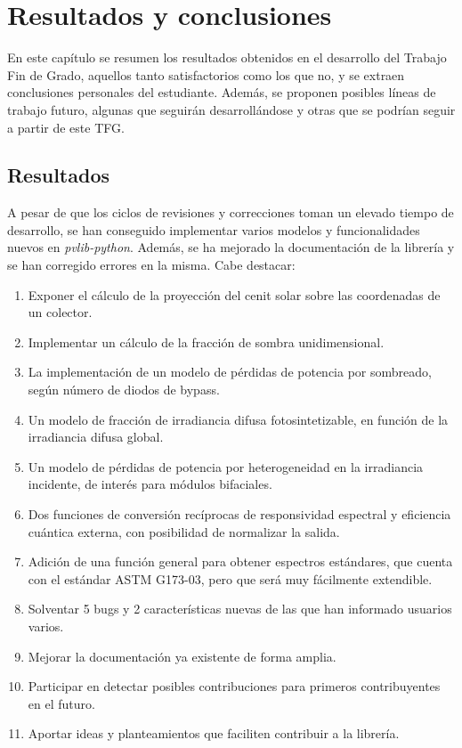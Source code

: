 \chapter{Resultados y conclusiones} \label{chp:resultados}

En este capítulo se resumen los resultados obtenidos en el desarrollo del Trabajo Fin de Grado, aquellos tanto satisfactorios como los que no, y se extraen conclusiones personales del estudiante. Además, se proponen posibles líneas de trabajo futuro, algunas que seguirán desarrollándose y otras que se podrían seguir a partir de este TFG.


\section{Resultados} \label{sct:resultados_resultados}

A pesar de que los ciclos de revisiones y correcciones toman un elevado tiempo de desarrollo, se han conseguido implementar varios modelos y funcionalidades nuevos en \textit{pvlib-python}. Además, se ha mejorado la documentación de la librería y se han corregido errores en la misma. Cabe destacar:

\begin{enumerate}
    \item Exponer el cálculo de la proyección del cenit solar sobre las coordenadas de un colector.
    \item Implementar un cálculo de la fracción de sombra unidimensional.
    \item La implementación de un modelo de pérdidas de potencia por sombreado, según número de diodos de bypass.
    \item Un modelo de fracción de irradiancia difusa fotosintetizable, en función de la irradiancia difusa global.
    \item Un modelo de pérdidas de potencia por heterogeneidad en la irradiancia incidente, de interés para módulos bifaciales.
    \item Dos funciones de conversión recíprocas de responsividad espectral y eficiencia cuántica externa, con posibilidad de normalizar la salida.
    \item Adición de una función general para obtener espectros estándares, que cuenta con el estándar ASTM G173-03, pero que será muy fácilmente extendible.
    \item Solventar 5 bugs y 2 características nuevas de las que han informado usuarios varios.
    \item Mejorar la documentación ya existente de forma amplia.
    \item Participar en detectar posibles contribuciones para primeros contribuyentes en el futuro.
    \item Aportar ideas y planteamientos que faciliten contribuir a la librería.
\end{enumerate}

